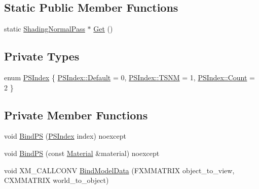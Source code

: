 \subsection*{Static Public Member Functions}
\begin{DoxyCompactItemize}
\item 
static \hyperlink{classmage_1_1_shading_normal_pass}{Shading\+Normal\+Pass} $\ast$ \hyperlink{classmage_1_1_shading_normal_pass_a27351f21b0e5d780b9c68e01f1428ace}{Get} ()
\end{DoxyCompactItemize}
\subsection*{Private Types}
\begin{DoxyCompactItemize}
\item 
enum \hyperlink{classmage_1_1_shading_normal_pass_a6d277753d26a7854c448b3e0d9275b19}{P\+S\+Index} \{ \hyperlink{classmage_1_1_shading_normal_pass_a6d277753d26a7854c448b3e0d9275b19a7a1920d61156abc05a60135aefe8bc67}{P\+S\+Index\+::\+Default} = 0, 
\hyperlink{classmage_1_1_shading_normal_pass_a6d277753d26a7854c448b3e0d9275b19a6e02c9f63944ea221e7d55c11ecae07b}{P\+S\+Index\+::\+T\+S\+NM} = 1, 
\hyperlink{classmage_1_1_shading_normal_pass_a6d277753d26a7854c448b3e0d9275b19ae93f994f01c537c4e2f7d8528c3eb5e9}{P\+S\+Index\+::\+Count} = 2
 \}
\end{DoxyCompactItemize}
\subsection*{Private Member Functions}
\begin{DoxyCompactItemize}
\item 
void \hyperlink{classmage_1_1_shading_normal_pass_ab691c2125f9e21c7e70f2737037504bc}{Bind\+PS} (\hyperlink{classmage_1_1_shading_normal_pass_a6d277753d26a7854c448b3e0d9275b19}{P\+S\+Index} index) noexcept
\item 
void \hyperlink{classmage_1_1_shading_normal_pass_a220c66c7fdbbb16cfeb8515e435cd846}{Bind\+PS} (const \hyperlink{classmage_1_1_material}{Material} \&material) noexcept
\item 
void X\+M\+\_\+\+C\+A\+L\+L\+C\+O\+NV \hyperlink{classmage_1_1_shading_normal_pass_adbaa57a7ff6bc885bf2ab890b0f933d4}{Bind\+Model\+Data} (F\+X\+M\+M\+A\+T\+R\+IX object\+\_\+to\+\_\+view, C\+X\+M\+M\+A\+T\+R\+IX world\+\_\+to\+\_\+object)
\end{DoxyCompactItemize}
